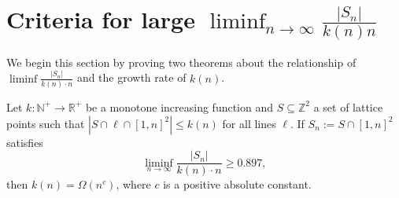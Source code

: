 \documentclass[11pt,a4paper]{article}
\numberwithin{equation}{section}
\newcommand{\nn}{\mathbb{N}}
\newcommand{\zz}{\mathbb{Z}}
\begin{document}
\section{Criteria for large $\displaystyle\liminf_{n\to\infty}\frac{|S_n|}{k(n)n}$}\label{criteria}

We begin this section by proving two theorems about the relationship of $\liminf \frac{|S_n|}{k(n)\cdot n}$ and the growth rate of $k(n)$.

\begin{theorem}
Let $k:\nn^+\to\mathbb{R}^+$ be a monotone increasing function and $S\subseteq\zz^{2}$ a set of lattice points such that $\left|S\cap\ell\cap[1,n]^{2}\right|\le k(n)$ for all lines $\ell$. If $S_n:=S\cap [1,n]^2$ satisfies
$$\liminf_{n\to\infty} \frac{|S_n|}{k(n)\cdot n} \ge 0.897,$$
then $k(n) = \Omega( n^c)$, where $c$ is a positive absolute constant.
\end{theorem}
\end{document}

